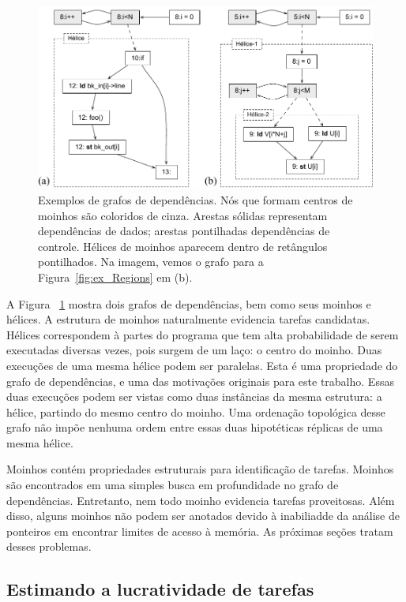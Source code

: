 \documentclass[sigplan,10pt,review]{acmart}
\begin{document}
\begin{figure}[h]
\begin{center}
\includegraphics[width=1\columnwidth]{images/ex_windmill}
\caption{Exemplos de grafos de dependências. Nós que formam centros de moinhos
são coloridos de cinza. Arestas sólidas representam dependências de dados; arestas pontilhadas
dependências de controle. Hélices de moinhos aparecem dentro de retângulos pontilhados.
Na imagem, vemos o grafo para a Figura~\ref{fig:ex_Regions} em (b).}
\label{fig:ex_windmill}
\end{center}
\end{figure}

A Figura ~\ref{fig:ex_windmill} mostra dois grafos de dependências, bem como seus
moinhos e hélices. A estrutura de moinhos naturalmente evidencia tarefas candidatas.
Hélices correspondem à partes do programa que tem alta probabilidade de serem
executadas diversas vezes, pois surgem de um laço: o centro do moinho. Duas execuções
de uma mesma hélice podem ser paralelas. Esta é uma propriedade do grafo de dependências, e uma 
das motivações originais para este trabalho. Essas duas execuções podem ser vistas como duas instâncias
da mesma estrutura: a hélice, partindo do mesmo centro do moinho. Uma ordenação topológica desse grafo não impõe
nenhuma ordem entre essas duas hipotéticas réplicas de uma mesma hélice.

Moinhos contém propriedades estruturais para identificação de tarefas. Moinhos são encontrados
em uma simples busca em profundidade no grafo de dependências. Entretanto, nem todo moinho
evidencia tarefas proveitosas. Além disso, alguns moinhos não podem ser anotados devido à inabiliadde 
da análise de ponteiros em encontrar limites de acesso à memória. As próximas seções tratam desses
problemas.

\subsection{Estimando a lucratividade de tarefas}
\label{sub:profit}
\end{document}
